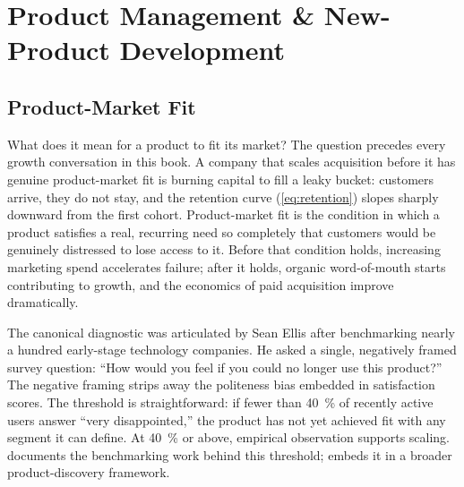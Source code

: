 \chapter{Product Management \& New-Product Development}\label{ch:product-management}


\section{Product-Market Fit}\label{sec:product-market-fit}

What does it mean for a product to fit its market? The question precedes every growth
conversation in this book. A company that scales acquisition before it has genuine
product-market fit is burning capital to fill a leaky bucket: customers arrive, they
do not stay, and the retention curve (\cref{eq:retention}) slopes sharply downward from
the first cohort. Product-market fit is the condition in which a product satisfies a
real, recurring need so completely that customers would be genuinely distressed to
lose access to it. Before that condition holds, increasing marketing spend accelerates
failure; after it holds, organic word-of-mouth starts contributing to growth, and the
economics of paid acquisition improve dramatically.

The canonical diagnostic was articulated by Sean Ellis after benchmarking nearly a
hundred early-stage technology companies. He asked a single, negatively framed survey
question: ``How would you feel if you could no longer use this product?'' The negative
framing strips away the politeness bias embedded in satisfaction scores. The threshold
is straightforward: if fewer than \qty{40}{\percent} of recently active users answer
``very disappointed,'' the product has not yet achieved fit with any segment it can
define. At \qty{40}{\percent} or above, empirical observation supports scaling.
\textcite{ellis2017hacking} documents the benchmarking work behind this threshold;
\textcite{cagan2018inspired} embeds it in a broader product-discovery framework.


